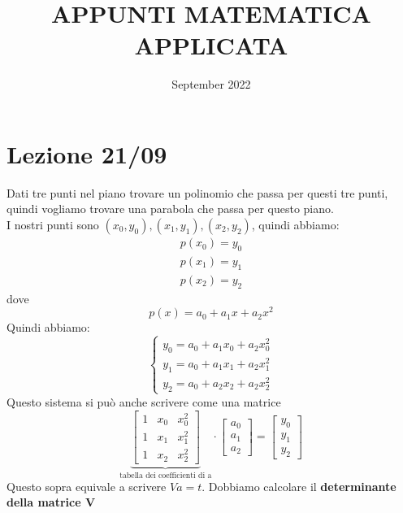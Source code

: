 \documentclass[a4paper, portrait]{book}
\title{APPUNTI MATEMATICA APPLICATA}
\author{\calligra{\LARGE Matteo Franchini}}
\date{September 2022}
\numberwithin{equation}{chapter} %
\begin{document}
\maketitle
\tableofcontents
\chapter{Lezione 21/09}
    Dati tre punti nel piano trovare un polinomio che passa per questi tre punti, quindi vogliamo trovare una parabola che passa per questo piano.\\
    I nostri punti sono $(x_0,y_0), (x_1,y_1), (x_2,y_2)$, quindi abbiamo:
    \begin{gather*}
        p(x_0)=y_0\\
        p(x_1)=y_1\\
        p(x_2)=y_2
    \end{gather*}
    dove \begin{equation}
        p(x) = a_0 + a_1 x + a_2 x^2
    \end{equation}
    Quindi abbiamo:
    \begin{equation}
        \begin{cases}
            y_0 = a_0 + a_1 x_0 + a_2 x_0^2\\
            y_1 = a_0 + a_1 x_1 + a_2 x_1^2\\
            y_2 = a_0 + a_2 x_2 + a_2 x_2^2
        \end{cases}
    \end{equation}
    Questo sistema si può anche scrivere come una matrice
    \begin{equation}
        \underbrace{\begin{bmatrix}
            1&x_0&x_0^2\\
            1&x_1&x_1^2\\
            1&x_2&x_2^2
        \end{bmatrix}}_{\text{tabella dei coefficienti di a}} \cdot
        \begin{bmatrix}
            a_0\\a_1\\a_2
        \end{bmatrix}
        = 
        \begin{bmatrix}
            y_0\\y_1\\y_2
        \end{bmatrix}
    \end{equation}
    Questo sopra equivale a scrivere $Va = t$. Dobbiamo calcolare il \textbf{determinante della matrice V}
\end{document}
